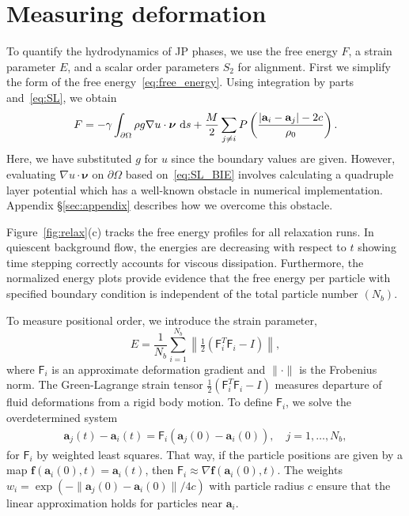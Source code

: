 \documentclass[prb,preprint,showpacs,preprintnumbers,amsmath,amssymb,longbibliography]{revtex4-1}
\renewcommand{\aa}{\mathbf{a}}
\newcommand{\nnu}{\boldsymbol{\nu}}
\newcommand{\ff}{\mathbf{f}}
\begin{document}
\section{Measuring deformation}
To quantify the hydrodynamics of JP phases,
we use the free energy $F$, a strain parameter $E$, and
a scalar order parameters $S_{2}$ for alignment.
First we simplify the form of the free energy~\eqref{eq:free_energy}.
Using integration by parts and~\eqref{eq:SL}, we obtain
\begin{equation}
\label{eq:free_energy2}
F = -\gamma
\int_{\partial \Omega} \rho g \nabla u \cdot \nnu \,\dif s
+ \frac{M}{2}
\sum_{j \neq i} 
P\left(\frac{|\aa_i - \aa_j|-2c}{\rho_0}\right).
\end{equation}
%
Here, we have substituted $g$ for $u$ since the boundary values are
given. However, evaluating $\nabla u \cdot \nnu$ on $\partial \Omega$ based
on~\eqref{eq:SL_BIE} involves calculating a quadruple layer potential
which has a well-known obstacle in numerical implementation.
Appendix \S\ref{sec:appendix} describes
how we overcome this obstacle.

Figure~\ref{fig:relax}(c) tracks the free energy profiles for all
relaxation runs.  In quiescent background flow, the energies are
decreasing with respect to $t$ showing time stepping correctly
accounts for viscous dissipation.  Furthermore, the normalized energy
plots provide evidence that the free energy per particle with specified
boundary condition is independent of the total particle number $(N_b)$.

To measure positional order, we introduce the strain
parameter, 
\begin{equation}
\label{eq:SP}
E = \frac{1}{N_b} \sum_{i=1}^{N_b}
\left\|\tfrac{1}{2}(\mathsf{F}_i^T \mathsf{F}_i - I)\right\|,
\end{equation}
where $\mathsf{F}_i$ is an approximate deformation gradient
and $\| \cdot \|$ is the Frobenius norm. 
The Green-Lagrange strain tensor
$\tfrac{1}{2}(\mathsf{F}_i^T \mathsf{F}_i - I)$
measures departure of fluid deformations from a rigid
body motion.  To define $\mathsf{F}_i$,
we
solve the overdetermined system 
\begin{align}
\aa_j(t) - \aa_i(t) = \mathsf{F}_i(\aa_j(0) - \aa_i(0)),\quad j =
  1,\ldots, N_b,
\end{align}
for $\mathsf{F}_i$ by weighted least squares.
That way, if the particle positions are given by
a map $\ff(\aa_i(0),t) = \aa_i(t)$, then
$\mathsf{F}_i \approx \nabla \ff(\aa_i(0),t)$.
The weights $w_i =
\exp(-\|\aa_j(0) - \aa_i(0)\|/4c)$ with particle radius $c$ ensure that
the linear approximation holds for particles near $\aa_i$.
\end{document}
